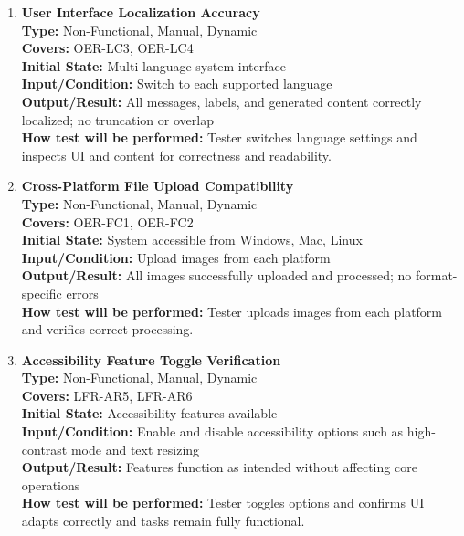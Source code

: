 \documentclass[12pt, titlepage]{article}
\begin{document}
\begin{enumerate}[label=NFR-ST \arabic*., wide=0pt, leftmargin=*]
  \item \textbf{User Interface Localization Accuracy} \\[2mm]
    \textbf{Type:} Non-Functional, Manual, Dynamic \\
    \textbf{Covers:} OER-LC3, OER-LC4 \\
    \textbf{Initial State:} Multi-language system interface \\
    \textbf{Input/Condition:} Switch to each supported language \\
    \textbf{Output/Result:} All messages, labels, and generated
    content correctly localized; no truncation or overlap \\[2mm]
    \textbf{How test will be performed:} Tester switches language
    settings and inspects UI and content for correctness and readability.

  \item \textbf{Cross-Platform File Upload Compatibility} \\[2mm]
    \textbf{Type:} Non-Functional, Manual, Dynamic \\
    \textbf{Covers:} OER-FC1, OER-FC2 \\
    \textbf{Initial State:} System accessible from Windows, Mac, Linux \\
    \textbf{Input/Condition:} Upload images from each platform \\
    \textbf{Output/Result:} All images successfully uploaded and
    processed; no format-specific errors \\[2mm]
    \textbf{How test will be performed:} Tester uploads images from
    each platform and verifies correct processing.

  \item \textbf{Accessibility Feature Toggle Verification} \\[2mm]
    \textbf{Type:} Non-Functional, Manual, Dynamic \\
    \textbf{Covers:} LFR-AR5, LFR-AR6 \\
    \textbf{Initial State:} Accessibility features available \\
    \textbf{Input/Condition:} Enable and disable accessibility
    options such as high-contrast mode and text resizing \\
    \textbf{Output/Result:} Features function as intended without
    affecting core operations \\[2mm]
    \textbf{How test will be performed:} Tester toggles options and
    confirms UI adapts correctly and tasks remain fully functional.


\end{enumerate}
\end{document}
